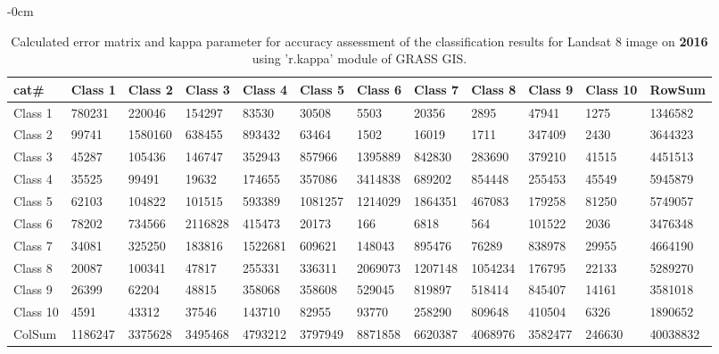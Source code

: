 \documentclass[sustainability,article,submit,pdftex,moreauthors]{Definitions/mdpi}
\begin{document}
\begin{table}[H] 
\footnotesize
    \centering
    \begin{adjustwidth}{-\extralength}{0cm}
    \caption{Calculated error matrix and kappa parameter for accuracy assessment of the classification results for Landsat 8 image on \textbf{2016} using 'r.kappa' module of GRASS GIS.\label{tab03}}
 	\begin{tabularx}{\fulllength}{|l|l|l|l|l|l|l|l|l|l|l|l|}
    \toprule
        cat\# & \textbf{Class 1} & \textbf{Class 2} & \textbf{Class 3} & \textbf{Class 4} & \textbf{Class 5} & \textbf{Class 6} & \textbf{Class 7} & \textbf{Class 8} & \textbf{Class 9} & \textbf{Class 10} & \textbf{RowSum} \\ \hline
        Class 1 & \cellcolor{green!20}780231 & 220046 & 154297 & 83530 & 30508 & 5503 & 20356 & 2895 & 47941 & 1275 & 1346582 \\ \hline
        Class 2 & 99741 & \cellcolor{green!20}1580160 & 638455 & 893432 & 63464 & 1502 & 16019 & 1711 & 347409 & 2430 & 3644323 \\ \hline
        Class 3 & 45287 & 105436 & \cellcolor{green!20}146747 & 352943 & 857966 & 1395889 & 842830 & 283690 & 379210 & 41515 & 4451513 \\ \hline
        Class 4 & 35525 & 99491 & 19632 & \cellcolor{green!20}174655 & 357086 & 3414838 & 689202 & 854448 & 255453 & 45549 & 5945879 \\ \hline
        Class 5 & 62103 & 104822 & 101515 & 593389 & \cellcolor{green!20}1081257 & 1214029 & 1864351 & 467083 & 179258 & 81250 & 5749057 \\ \hline
        Class 6 & 78202 & 734566 & 2116828 & 415473 & 20173 & \cellcolor{green!20}166 & 6818 & 564 & 101522 & 2036 & 3476348 \\ \hline
        Class 7 & 34081 & 325250 & 183816 & 1522681 & 609621 & 148043 & \cellcolor{green!20}895476 & 76289 & 838978 & 29955 & 4664190 \\ \hline
        Class 8 & 20087 & 100341 & 47817 & 255331 & 336311 & 2069073 & 1207148 & \cellcolor{green!20}1054234 & 176795 & 22133 & 5289270 \\ \hline
        Class 9 & 26399 & 62204 & 48815 & 358068 & 358608 & 529045 & 819897 & 518414 & \cellcolor{green!20}845407 & 14161 & 3581018 \\ \hline
        Class 10 & 4591 & 43312 & 37546 & 143710 & 82955 & 93770 & 258290 & 809648 & 410504 & \cellcolor{green!20}6326 & 1890652 \\ \hline
        ColSum & 1186247 & 3375628 & 3495468 & 4793212 & 3797949 & 8871858 & 6620387 & 4068976 & 3582477 & 246630 & \cellcolor{green!20}40038832 \\ \hline
        \bottomrule
    \end{tabularx}
    \end{adjustwidth}
\end{table}
\end{document}
